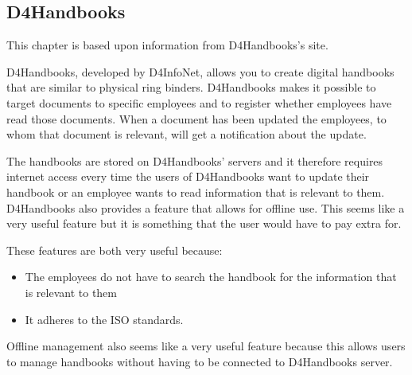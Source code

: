 \subsection{D4Handbooks}
This chapter is based upon information from D4Handbooks's site\cite{D4Hanbook}.

D4Handbooks, developed by D4InfoNet, allows you to create digital handbooks that are similar to physical ring binders.
D4Handbooks makes it possible to target documents to specific employees and to register whether employees have read those documents.
When a document has been updated the employees, to whom that document is relevant, will get a notification about the update.

The handbooks are stored on D4Handbooks' servers and it therefore requires internet access every time the users of D4Handbooks want to update their handbook or an employee wants to read information that is relevant to them.
D4Handbooks also provides a feature that allows for offline use. This seems like a very useful feature but it is something that the user would have to pay extra for.

These features are both very useful because:

\begin{itemize}
        \item
        The employees do not have to search the handbook for the information that is relevant to them
        \item
        It adheres to the ISO standards.
\end{itemize}

Offline management also seems like a very useful feature because this allows users to manage handbooks without having to be connected to D4Handbooks server.
